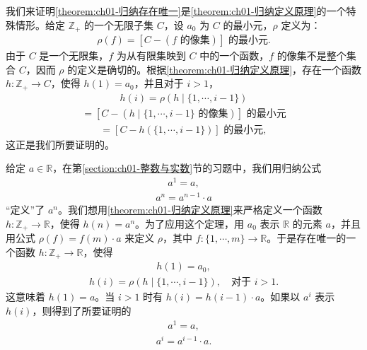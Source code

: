 \documentclass[../../main.tex]{subfiles}
\begin{document}
\begin{example}\label{example:ch01-归纳特殊情形}
我们来证明\cref{theorem:ch01-归纳存在唯一}是\cref{theorem:ch01-归纳定义原理}的一个特殊情形。给定 $\mathbb{Z}_{+}$ 的一个无限子集 $C$，设 $a_{0}$ 为 $C$ 的最小元，$\rho$ 定义为：
\begin{align*}
\rho(f) = [C - (f \text{ 的像集})] \text{ 的最小元}.
\end{align*}
由于 $C$ 是一个无限集，$f$ 为从有限集映到 $C$ 中的一个函数，$f$ 的像集不是整个集合 $C$，因而 $\rho$ 的定义是确切的。根据\cref{theorem:ch01-归纳定义原理}，存在一个函数 $h: \mathbb{Z}_{+} \longrightarrow C$，使得 $h(1) = a_{0}$，并且对于 $i > 1$，
\begin{align*}
h(i) = \rho(h \mid \{1, \cdots, i-1\})
\end{align*}
\begin{align*}
= [C - (h \mid \{1, \cdots, i-1\} \text{ 的像集})] \text{ 的最小元}
\end{align*}
\begin{align*}
= [C - h(\{1, \cdots, i-1\})] \text{ 的最小元},
\end{align*}
这正是我们所要证明的。
\end{example}

\begin{example}\label{example:ch01-幂归纳}
给定 $a \in \mathbb{R}$，在第\cref{section:ch01-整数与实数}节的习题中，我们用归纳公式
\begin{align*}
a^{1} = a,
\end{align*}
\begin{align*}
a^{n} = a^{n-1} \cdot a
\end{align*}
“定义”了 $a^{n}$。我们想用\cref{theorem:ch01-归纳定义原理}来严格定义一个函数 $h: \mathbb{Z}_{+} \longrightarrow \mathbb{R}$，使得 $h(n) = a^{n}$。为了应用这个定理，用 $a_{0}$ 表示 $\mathbb{R}$ 的元素 $a$，并且用公式 $\rho(f) = f(m) \cdot a$ 来定义 $\rho$，其中 $f: \{1, \cdots, m\} \longrightarrow \mathbb{R}$。于是存在唯一的一个函数 $h: \mathbb{Z}_{+} \longrightarrow \mathbb{R}$，使得
\begin{align*}
h(1) = a_{0},
\end{align*}
\begin{align*}
h(i) = \rho(h \mid \{1, \cdots, i-1\}), \quad \text{对于 } i > 1.
\end{align*}
这意味着 $h(1) = a$。当 $i > 1$ 时有 $h(i) = h(i-1) \cdot a$。如果以 $a^{i}$ 表示 $h(i)$，则得到了所要证明的
\begin{align*}
a^{1} = a,
\end{align*}
\begin{align*}
a^{i} = a^{i-1} \cdot a.
\end{align*}
\end{example}
\end{document}
